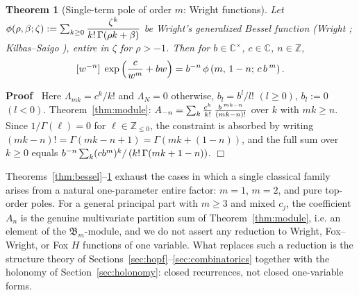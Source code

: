 \documentclass{article}
\newcommand{\assign}{:=}
\newcommand{\tmem}[1]{{\em #1\/}}
\newenvironment{proof}{\noindent\textbf{Proof\ }}{\hspace*{\fill}$\Box$\medskip}
\newtheorem{theorem}{Theorem}
\newcommand{\CA}{\mathfrak{B}}
\newcommand{\C}{\mathbb{C}}
\newcommand{\Z}{\mathbb{Z}}
\begin{document}
\begin{theorem}
  [Single-term pole of order $m$: Wright functions]\label{thm:wright} Let
  $\phi (\rho, \beta ; \zeta) \assign \sum_{k \ge 0} \dfrac{\zeta^k}{k!
  \hspace{0.17em} \Gamma (\rho k + \beta)}$ be Wright's generalized Bessel
  function {\tmem{(Wright {\cite{Wright1933}}; Kilbas--Saigo
  {\cite[{\textsection}1.11]{KilbasSaigo}})}}, entire in $\zeta$ for $\rho > -
  1$. Then for $b \in \C^{\times}$, $c \in \C$, $n \in \Z$,
  \[ [w^{- n}]  \hspace{0.27em} \exp \left( \frac{c}{w^m} + bw \right) = b^{-
     n}  \hspace{0.17em} \phi \left( m, \hspace{0.17em} 1 - n ;
     \hspace{0.17em} c \hspace{0.17em} b^{\hspace{0.17em} m} \right) . \]
\end{theorem}

\begin{proof}
  Here $\Lambda_{mk} = c^k / k$! and $\Lambda_N = 0$ otherwise, $b_l = b^l /
  l$! $(l \ge 0)$, $b_l \assign 0$ $(l < 0)$. Theorem~\ref{thm:module}: $A_{-
  n} = \sum_k \frac{c^k}{k!}  \hspace{0.17em} \frac{b^{\hspace{0.17em} mk -
  n}}{(mk - n) !}$ over $k$ with $mk \ge n$. Since $1 / \Gamma (\ell) = 0$ for
  $\ell \in \Z_{\le 0}$, the constraint is absorbed by writing $(mk - n) ! =
  \Gamma (mk - n + 1) = \Gamma (mk + (1 - n))$, and the full sum over $k \ge
  0$ equals $b^{- n}  \sum_k (cb^m)^k / \left( k! \hspace{0.17em} \Gamma (mk +
  1 - n) \right)$.
\end{proof}

\begin{remark}
  \label{rem:scope}
  Theorems~\ref{thm:bessel}--\ref{thm:wright} exhaust the cases in which a
  single classical family arises from a natural one-parameter entire factor:
  $m = 1$, $m = 2$, and pure top-order poles. For a general principal part
  with $m \ge 3$ and mixed $c_j$, the coefficient $A_n$ is the genuine
  multivariate partition sum of Theorem~\ref{thm:module}, i.e. an element of
  the $\CA_m$-module, and we do not assert any reduction to Wright,
  Fox--Wright, or Fox $H$ functions of one variable. What replaces such a
  reduction is the structure theory of
  Sections~\ref{sec:hopf}--\ref{sec:combinatorics} together with the holonomy
  of Section~\ref{sec:holonomy}: closed recurrences, not closed one-variable
  forms.
\end{remark}
\end{document}
